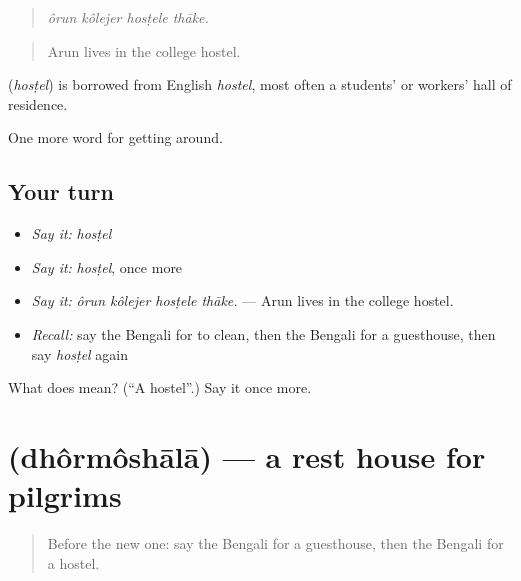 \begin{quote}
\emph{ôrun kôlejer hosṭele thāke.}
\end{quote}

\begin{quote}
Arun lives in the college hostel.
\end{quote}

\begin{cousinweb}
\textbf{} (\emph{hosṭel}) is borrowed from English \emph{hostel}, most often a students' or workers' hall of residence.
\end{cousinweb}

\begin{grammarlens}[title={What you've built}]
One more word for getting around.
\end{grammarlens}

\subsection*{Your turn}
\begin{itemize}
\raggedright
  \item \emph{Say it:} \emph{hosṭel}
  \item \emph{Say it:} \emph{hosṭel}, once more
  \item \emph{Say it:} \emph{ôrun kôlejer hosṭele thāke.} — Arun lives in the college hostel.
  \item \emph{Recall:} say the Bengali for to clean, then the Bengali for a guesthouse, then say \emph{hosṭel} again
\end{itemize}

\begin{tcolorbox}[breakable,colback=teal!4,colframe=teal!35!black,title={Before you move on}]
What does  mean? (\textquotedblleft{}A hostel\textquotedblright{}.) Say it once more.
\end{tcolorbox}
\section[\texorpdfstring{\bn{ধর্মশালা} (dhôrmôshālā)}{ধর্মশালা (dhôrmôshālā)}]{ (dhôrmôshālā) — a rest house for pilgrims}

\label{lesson:BN-C406-dhormoshala}



\begin{quote}
Before the new one: say the Bengali for a guesthouse, then the Bengali for a hostel.
\end{quote}

